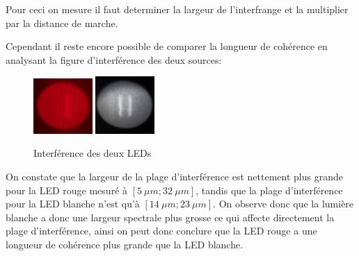 \documentclass[11pt, openright]{book}
\begin{document}
					Pour ceci on mesure il faut determiner la largeur de l'interfrange et la multiplier par la distance de marche.

					Cependant il reste encore possible de comparer la longueur de cohérence en analysant la figure d'interférence des deux sources:

					\begin{figure}
						\centering
						\includegraphics[width=0.2\textwidth]{./object/g7.jpg}
						\hspace{2cm}
						\includegraphics[width=0.2\textwidth]{./object/g8.jpg}
						\caption{Interférence des deux LEDs}
					\end{figure}

					On constate que la largeur de la plage d'interférence est nettement plus grande pour la LED rouge mesuré à $\left[ 5\ \mu m;32\ \mu m \right] $, tandis que la plage d'interférence pour la LED blanche n'est qu'à $\left[ 14\ \mu m;23\ \mu m \right] $. On observe donc que la lumière blanche a donc une largeur spectrale plus grosse ce qui affecte directement la plage d'interférence, ainsi on peut donc conclure que la LED rouge a une longueur de cohérence plus grande que la LED blanche.






















				
				




    
\end{document}
